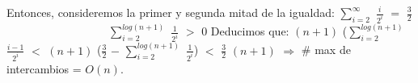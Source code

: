 \documentclass[10pt,a4paper]{article}
\begin{document}
\newline
\newline
\newline
Entonces, consideremos la primer y segunda mitad de la igualdad:
\newline
\newline
$\displaystyle \sum_{i=2}^{\infty}$ $\displaystyle \frac{i}{2^{i}}$ $=$ $\displaystyle \frac{3}{2}$~~~~~~~~~~~~~~~~~~$\displaystyle \sum_{i=2}^{log(n+1)}$ $\displaystyle \frac{1}{2^{i}}$ $>$ $0$
\newline
\newline
\newline
Deducimos que:
\newline
\newline
$(n+1)$ ($\displaystyle \sum_{i=2}^{log(n+1)}$ $\displaystyle \frac{i-1}{2^{i}}$ $<$ $(n+1)$ ($\displaystyle \frac{3}{2}$ $-$ $\displaystyle \sum_{i=2}^{log(n+1)}$ $\displaystyle \frac{1}{2^{i}}$) $<$ $\displaystyle \frac{3}{2}$ $(n+1)$ $\Rightarrow$ \# max de intercambios = $O(n)$.
\newpage
\end{document}
